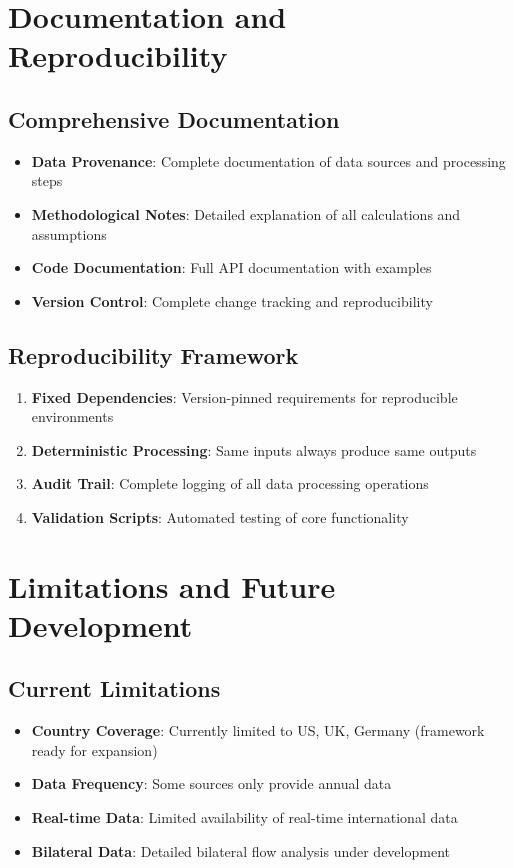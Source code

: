 \documentclass[11pt,a4paper]{article}
\begin{document}
\section{Documentation and Reproducibility}

\subsection{Comprehensive Documentation}
\begin{itemize}
    \item \textbf{Data Provenance}: Complete documentation of data sources and processing steps
    \item \textbf{Methodological Notes}: Detailed explanation of all calculations and assumptions
    \item \textbf{Code Documentation}: Full API documentation with examples
    \item \textbf{Version Control}: Complete change tracking and reproducibility
\end{itemize}

\subsection{Reproducibility Framework}
\begin{enumerate}
    \item \textbf{Fixed Dependencies}: Version-pinned requirements for reproducible environments
    \item \textbf{Deterministic Processing}: Same inputs always produce same outputs
    \item \textbf{Audit Trail}: Complete logging of all data processing operations
    \item \textbf{Validation Scripts}: Automated testing of core functionality
\end{enumerate}

\section{Limitations and Future Development}

\subsection{Current Limitations}
\begin{itemize}
    \item \textbf{Country Coverage}: Currently limited to US, UK, Germany (framework ready for expansion)
    \item \textbf{Data Frequency}: Some sources only provide annual data
    \item \textbf{Real-time Data}: Limited availability of real-time international data
    \item \textbf{Bilateral Data}: Detailed bilateral flow analysis under development
\end{itemize}
\end{document}
